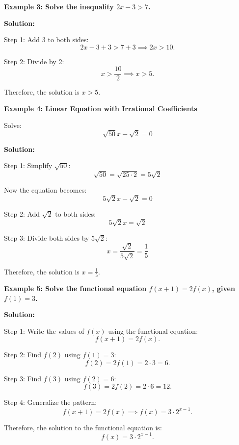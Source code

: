 \begin{flushleft}
\textbf{Example 3: Solve the inequality $2x - 3 > 7$.}

\vspace{0.5cm}
\textbf{Solution:}
\vspace{0.5cm}

Step 1: Add 3 to both sides:
\[
2x - 3 + 3 > 7 + 3 \implies 2x > 10.
\]

Step 2: Divide by 2:
\[
x > \frac{10}{2} \implies x > 5.
\]

Therefore, the solution is $x > 5$.
\end{flushleft}
\begin{flushleft}
\textbf{Example 4: Linear Equation with Irrational Coefficients}

Solve:  
\[
\sqrt{50}x - \sqrt{2} = 0
\]

\textbf{Solution:} \vspace{0.2cm}

Step 1: Simplify \(\sqrt{50}\):  
\[
\sqrt{50} = \sqrt{25 \cdot 2} = 5\sqrt{2}
\]

Now the equation becomes:  
\[
5\sqrt{2}x - \sqrt{2} = 0
\]

Step 2: Add \(\sqrt{2}\) to both sides:  
\[
5\sqrt{2}x = \sqrt{2}
\]

Step 3: Divide both sides by \(5\sqrt{2}\):  
\[
x = \frac{\sqrt{2}}{5\sqrt{2}} = \frac{1}{5}
\]

Therefore, the solution is \( \boxed{x = \frac{1}{5}} \).
\end{flushleft}


\begin{flushleft}
\textbf{Example 5: Solve the functional equation $f(x+1) = 2f(x)$, given $f(1) = 3$.}

\vspace{0.5cm}
\textbf{Solution:}
\vspace{0.5cm}

Step 1: Write the values of $f(x)$ using the functional equation:
\[
f(x+1) = 2f(x).
\]

Step 2: Find $f(2)$ using $f(1) = 3$:
\[
f(2) = 2f(1) = 2 \cdot 3 = 6.
\]

Step 3: Find $f(3)$ using $f(2) = 6$:
\[
f(3) = 2f(2) = 2 \cdot 6 = 12.
\]

Step 4: Generalize the pattern:
\[
f(x+1) = 2f(x) \implies f(x) = 3 \cdot 2^{x-1}.
\]

Therefore, the solution to the functional equation is:
\[
f(x) = 3 \cdot 2^{x-1}.
\]
\end{flushleft}
